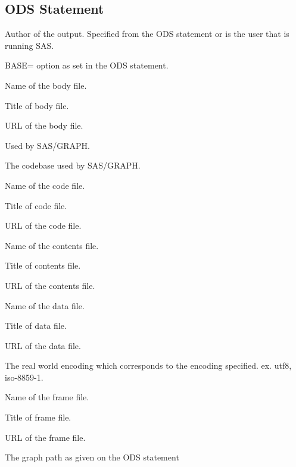 \subsection{ODS Statement}

\begin{description}

Author of the output. Specified from the ODS statement or is the user that is running SAS.

BASE= option as set in the ODS statement.

Name of the body file.

Title of body file.

URL of the body file.

Used by SAS/GRAPH.

The codebase used by SAS/GRAPH.

Name of the code file.

Title of code file.

URL of the code file.

Name of the contents file.

Title of contents file.

URL of the contents file.

Name of the data file.

Title of data file.

URL of the data file.

The real world encoding which corresponds to the encoding specified. ex. utf8, iso-8859-1.

Name of the frame file.

Title of frame file.

URL of the frame file.

The graph path as given on the ODS statement


\end{description}
